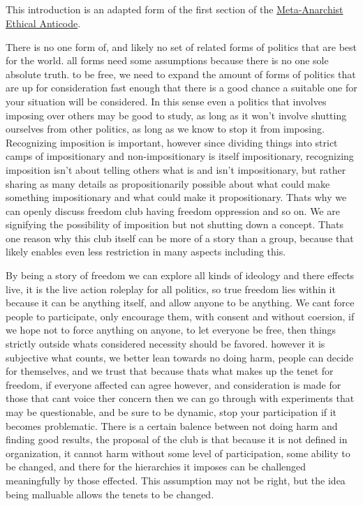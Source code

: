\documentclass[letter]{article}
\begin{document}
\subsection{}
This introduction is an adapted form of the first section of the \href{https://www.reddit.com/r/metaanarchy/comments/iwlqz8/the_metaanarchist_ethical_anticode/}{Meta-Anarchist Ethical Anticode}.

There is no one form of, and likely no set of related forms of politics that are best for the world. all forms need some assumptions because there is no one sole absolute truth. to be free, we need to expand the amount of forms of politics that are up for consideration fast enough that there is a good chance a suitable one for your situation will be considered. In this sense even a politics that involves imposing over others may be good to study, as long as it won't involve shutting ourselves from other politics, as long as we know to stop it from imposing. Recognizing imposition is important, however since dividing things into strict camps of impositionary and non-impositionary is itself impositionary, recognizing imposition isn't about telling others what is and isn't impositionary, but rather sharing as many details as propositionarily possible about what could make something impositionary and what could make it propositionary. Thats why we can openly discuss freedom club having freedom oppression and so on. We are signifying the possibility of imposition but not shutting down a concept. Thats one reason why this club itself can be more of a story than a group, because that likely enables even less restriction in many aspects including this.

By being a story of freedom we can explore all kinds of ideology and there effects live, it is the live action roleplay for all politics, so true freedom lies within it because it can be anything itself, and allow anyone to be anything. We cant force people to participate, only encourage them, with consent and without coersion, if we hope not to force anything on anyone, to let everyone be free, then things strictly outside whats considered necessity should be favored. however it is subjective what counts, we better lean towards no doing harm, people can decide for themselves, and we trust that because thats what makes up the tenet for freedom, if everyone affected can agree however, and consideration is made for those that cant voice ther concern then we can go through with experiments that may be questionable, and be sure to be dynamic, stop your participation if it becomes problematic. There is a certain balence between not doing harm and finding good results, the proposal of the club is that because it is not defined in organization, it cannot harm without some level of participation, some ability to be changed, and there for the hierarchies it imposes can be challenged meaningfully by those effected. This assumption may not be right, but the idea being malluable allows the tenets to be changed.
\end{document}

